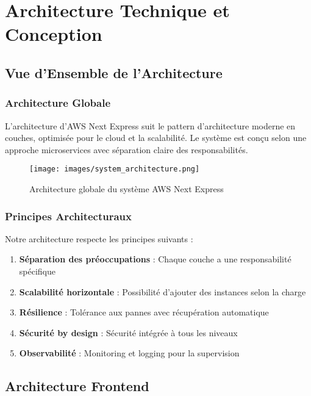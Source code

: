 \chapter{Architecture Technique et Conception}

\section{Vue d'Ensemble de l'Architecture}

\subsection{Architecture Globale}

L'architecture d'AWS Next Express suit le pattern d'architecture moderne en couches, optimisée pour le cloud et la scalabilité. Le système est conçu selon une approche microservices avec séparation claire des responsabilités.

\begin{figure}[H]
    \centering
    \texttt{[image: images/system\_architecture.png]}
    \caption{Architecture globale du système AWS Next Express}
    \label{fig:system_architecture}
\end{figure}

\subsection{Principes Architecturaux}

Notre architecture respecte les principes suivants :

\begin{enumerate}
    \item \textbf{Séparation des préoccupations} : Chaque couche a une responsabilité spécifique
    \item \textbf{Scalabilité horizontale} : Possibilité d'ajouter des instances selon la charge
    \item \textbf{Résilience} : Tolérance aux pannes avec récupération automatique
    \item \textbf{Sécurité by design} : Sécurité intégrée à tous les niveaux
    \item \textbf{Observabilité} : Monitoring et logging pour la supervision
\end{enumerate}

\section{Architecture Frontend}


